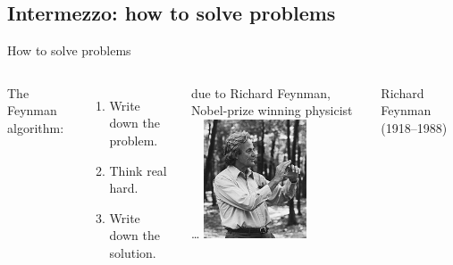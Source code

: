 \documentclass[aspectratio=169,usenames,dvipsnames]{beamer}
\begin{document}
\subsection{Intermezzo: how to solve problems}
\begin{frame}{How to solve problems}
    \begin{columns}
            The Feynman algorithm:
            \begin{enumerate}
                \item Write down the problem.
                \item Think real hard.
                \item Write down the solution.
            \end{enumerate}

            \vspace{1em}
            due to Richard Feynman, \\
            Nobel-prize winning physicist \dots
        \centering
            \includegraphics[width=0.6\textwidth]{fig/feynman}

            \vspace{1em} Richard Feynman (1918--1988)
    \end{columns}
\end{frame}
\end{document}
